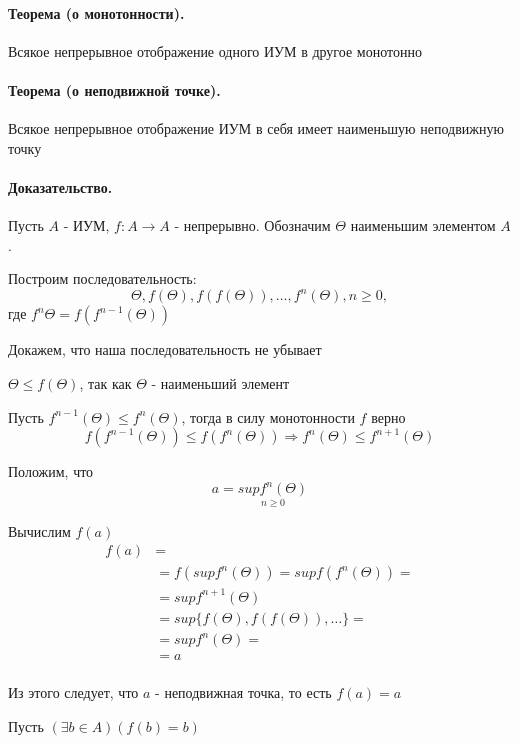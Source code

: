 \documentclass{report}
\begin{document}
\paragraph*{Теорема (о монотонности).}
Всякое непрерывное отображение одного ИУМ в другое монотонно


\paragraph*{Теорема (о неподвижной точке).}
Всякое непрерывное отображение ИУМ в себя имеет наименьшую неподвижную точку
\paragraph*{Доказательство.}
Пусть $A$ - ИУМ, $f: A \rightarrow A$ - непрерывно. Обозначим $\Theta$ наименьшим элементом $A$.\newline

Построим последовательность:
\[
\Theta, f(\Theta), f(f(\Theta)), \ldots, f^{n}(\Theta), n \geq 0,
\] 
где $f^{n}{\Theta} = f(f^{n - 1}(\Theta))$

\medskip
Докажем, что наша последовательность не убывает


$\Theta \leq f(\Theta)$, так как $\Theta$ - наименьший элемент

\medskip

Пусть $f^{n-1}(\Theta) \leq f^{n}(\Theta)$, тогда в силу монотонности $f$ верно
\[
f(f^{n-1}(\Theta)) \leq f(f^{n}(\Theta)) \Rightarrow f^{n}(\Theta) \leq f^{n+1}(\Theta)
\] 

\medskip

Положим, что
\[
a = \underset{n \geq 0}{supf^{n}(\Theta)}
\] 
\medskip


Вычислим $f(a)$
\begin{align*}
	f(a) &= \\
	     &= f(supf^{n}(\Theta)) = supf(f^{n}(\Theta)) = \\
	     &= supf^{n+1}(\Theta) \\
	     &= sup\{f(\Theta), f(f(\Theta)), \ldots\} =   \\
	     &= supf^n(\Theta) =\\
	     &= a \\
\end{align*}

Из этого следует, что $a$ - неподвижная точка, то есть $f(a) = a$

\medskip

Пусть $(\exists b \in A)(f(b) = b)$
\end{document}

